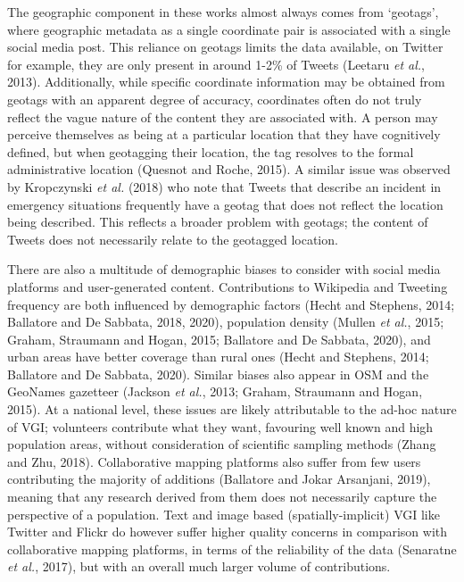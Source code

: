 \documentclass[
  letterpaper,
  11pt,
  english,
  onehalfspacing,
  headsepline]{MastersDoctoralThesis}
\begin{document}
The geographic component in these works almost always comes from
`geotags', where geographic metadata as a single coordinate pair is
associated with a single social media post. This reliance on geotags
limits the data available, on Twitter for example, they are only present
in around 1-2\% of Tweets (Leetaru \emph{et al.}, 2013). Additionally,
while specific coordinate information may be obtained from geotags with
an apparent degree of accuracy, coordinates often do not truly reflect
the vague nature of the content they are associated with. A person may
perceive themselves as being at a particular location that they have
cognitively defined, but when geotagging their location, the tag
resolves to the formal administrative location (Quesnot and Roche,
2015). A similar issue was observed by Kropczynski \emph{et al.} (2018)
who note that Tweets that describe an incident in emergency situations
frequently have a geotag that does not reflect the location being
described. This reflects a broader problem with geotags; the content of
Tweets does not necessarily relate to the geotagged location.

There are also a multitude of demographic biases to consider with social
media platforms and user-generated content. Contributions to Wikipedia
and Tweeting frequency are both influenced by demographic factors (Hecht
and Stephens, 2014; Ballatore and De Sabbata, 2018, 2020), population
density (Mullen \emph{et al.}, 2015; Graham, Straumann and Hogan, 2015;
Ballatore and De Sabbata, 2020), and urban areas have better coverage
than rural ones (Hecht and Stephens, 2014; Ballatore and De Sabbata,
2020). Similar biases also appear in OSM and the GeoNames gazetteer
(Jackson \emph{et al.}, 2013; Graham, Straumann and Hogan, 2015). At a
national level, these issues are likely attributable to the ad-hoc
nature of VGI; volunteers contribute what they want, favouring well
known and high population areas, without consideration of scientific
sampling methods (Zhang and Zhu, 2018). Collaborative mapping platforms
also suffer from few users contributing the majority of additions
(Ballatore and Jokar Arsanjani, 2019), meaning that any research derived
from them does not necessarily capture the perspective of a population.
Text and image based (spatially-implicit) VGI like Twitter and Flickr do
however suffer higher quality concerns in comparison with collaborative
mapping platforms, in terms of the reliability of the data (Senaratne
\emph{et al.}, 2017), but with an overall much larger volume of
contributions.
\end{document}
